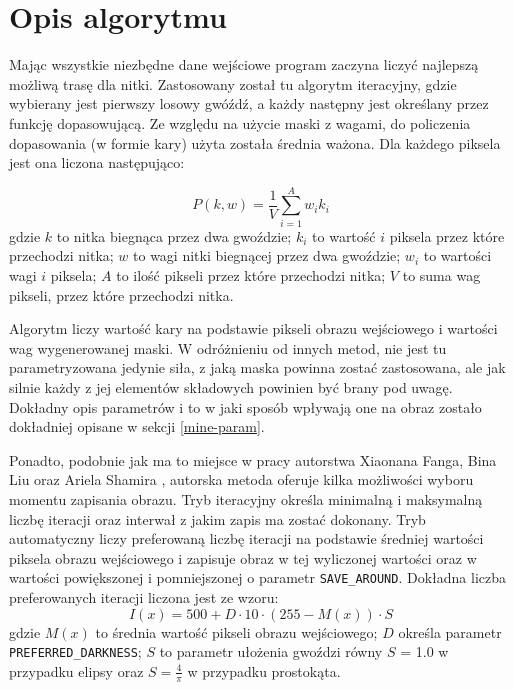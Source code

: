     \section{Opis algorytmu} \label{mine-algorithm}
    Mając wszystkie niezbędne dane wejściowe program zaczyna liczyć najlepszą możliwą trasę dla nitki. Zastosowany został tu algorytm iteracyjny, gdzie wybierany jest pierwszy losowy gwóźdź, a każdy następny jest określany przez funkcję dopasowującą. Ze względu na użycie maski z wagami, do policzenia dopasowania (w formie kary) użyta została średnia ważona. Dla każdego piksela jest ona liczona następująco: 
    
    \begin{equation} \label{mine-algorithm-penalty}
        P(k, w) = \frac{1}{V} \sum_{i=1}^A w_i k_i
    \end{equation}
    gdzie \(k\) to nitka biegnąca przez dwa gwoździe; \(k_i\) to wartość \(i\) piksela przez które przechodzi nitka; \(w\) to wagi nitki biegnącej przez dwa gwoździe; \(w_i\) to wartości wagi \(i\) piksela; \(A\) to ilość pikseli przez które przechodzi nitka; \(V\) to suma wag pikseli, przez które przechodzi nitka.
    
    Algorytm liczy wartość kary na podstawie pikseli obrazu wejściowego i wartości wag wygenerowanej maski. W odróżnieniu od innych metod, nie jest tu parametryzowana jedynie siła, z jaką maska powinna zostać zastosowana, ale jak silnie każdy z jej elementów składowych powinien być brany pod uwagę. Dokładny opis parametrów i to w jaki sposób wpływają one na obraz zostało dokładniej opisane w sekcji \ref{mine-param}.
    
    Ponadto, podobnie jak ma to miejsce w pracy autorstwa Xiaonana Fanga, Bina Liu oraz Ariela Shamira \cite{article-string-art-xiaonan}, autorska metoda oferuje kilka możliwości wyboru momentu zapisania obrazu. Tryb iteracyjny określa minimalną i maksymalną liczbę iteracji oraz interwał z jakim zapis ma zostać dokonany. Tryb automatyczny liczy preferowaną liczbę iteracji na podstawie średniej wartości piksela obrazu wejściowego i zapisuje obraz w tej wyliczonej wartości oraz w wartości powiększonej i pomniejszonej o parametr \texttt{SAVE_AROUND}. Dokładna liczba preferowanych iteracji liczona jest ze wzoru:
    \begin{equation} \label{mine-algorithm-iterations}
        I(x) = 500 + D \cdot 10 \cdot (255 - M(x)) \cdot S
    \end{equation}
    gdzie \(M(x)\) to średnia wartość pikseli obrazu wejściowego; \(D\) określa parametr \texttt{PREFERRED_DARKNESS}; \(S\) to parametr ułożenia gwoździ równy \(S\) = 1.0 w przypadku elipsy oraz \(S = \frac{4}{\pi}\) w przypadku prostokąta.
    
